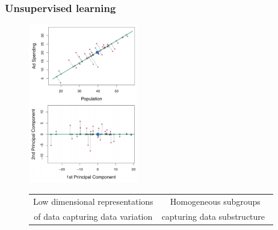 \documentclass[xcolor={dvipsnames}]{beamer}
\begin{document}
\frame
{
 \frametitle{Unsupervised learning}

\vspace{-1.5em}
\begin{figure}
\centering
\includegraphics[width=1.87in]{stuffs/pca.png} 
\begin{tabular}{cc}
Low dimensional representations & Homogeneous subgroups \\
of data capturing data variation  & capturing data substructure\
\end{tabular}
\end{figure}

}
\end{document}
